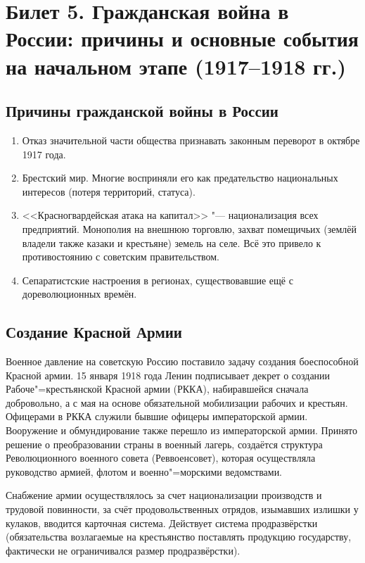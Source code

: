 \section{Билет 5. Гражданская война в России: причины и основные события на начальном этапе (1917--1918 гг.)}

\subsection{Причины гражданской войны в России}
\begin{enumerate}
	\item Отказ значительной части общества признавать законным переворот в октябре 1917 года.
	\item Брестский мир. Многие восприняли его как предательство национальных интересов (потеря территорий, статуса).
	\item <<Красногвардейская атака на капитал>> "--- национализация всех предприятий. Монополия на внешнюю торговлю, захват помещичьих (землёй владели также казаки и крестьяне) земель на селе. Всё это привело к противостоянию с советским правительством.
	\item Сепаратистские настроения в регионах, существовавшие ещё с дореволюционных времён.
\end{enumerate}




\subsection{Создание Красной Армии}
Военное давление на советскую Россию поставило задачу создания боеспособной Красной армии. 15 января 1918 года Ленин подписывает декрет о создании Рабоче"=крестьянской Красной армии (РККА), набиравшейся сначала добровольно, а с мая на основе обязательной мобилизации рабочих и крестьян. Офицерами в РККА служили бывшие офицеры императорской армии. Вооружение и обмундирование также перешло из императорской армии. 
Принято решение о преобразовании страны в военный лагерь, создаётся структура Революционного военного совета (Реввоенсовет), которая осуществляла руководство армией, флотом и военно"=морскими ведомствами.

Снабжение армии осуществлялось за счет национализации производств и трудовой повинности, за счёт продовольственных отрядов, изымавших излишки у кулаков, вводится карточная система. Действует система продразвёрстки (обязательства возлагаемые на крестьянство поставлять продукцию государству, фактически не ограничивался размер продразвёрстки).


